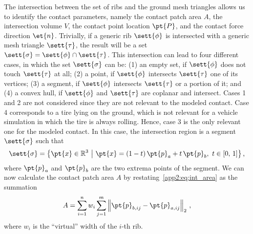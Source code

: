 The intersection between the set of ribs  and the ground mesh triangles  allows us to identify the contact parameters, namely the contact patch area $A$, the intersection volume $V$, the contact point location $\pt{P}$, and the contact force direction $\et{n}$. Trivially, if a generic rib $\sett{\phi}$ is intersected with a generic mesh triangle $\sett{\tau}$, the result will be a set $\sett{\sigma} = \sett{\phi} \cap \sett{\tau}$. This intersection can lead to four different cases, in which the set $\sett{\sigma}$ can be: (1) an empty set, if $\sett{\phi}$ does not touch $\sett{\tau}$ at all; (2) a point, if $\sett{\phi}$ intersects $\sett{\tau}$ one of its vertices; (3) a segment, if $\sett{\phi}$ intersects $\sett{\tau}$ or a portion of it; and (4) a convex hull, if $\sett{\phi}$ and $\sett{\tau}$ are coplanar and intersect. Cases 1 and 2 are not considered since they are not relevant to the modeled contact. Case 4 corresponds to a tire lying on the ground, which is not relevant for a vehicle simulation in which the tire is always rolling. Hence, case 3 is the only relevant one for the modeled contact. In this case, the intersection region is a segment $\sett{\sigma}$ such that
%
\begin{equation*}
  \sett{\sigma} = \big\{ \pt{x}\in\mathbb{R}^3 ~ \big\lvert ~ \pt{x}=(1-t)\,\pt{p}_a + t\,\pt{p}_b, ~ t \in [0, \, 1] \big\}
   \, \text{,}
\end{equation*}
%
where $\pt{p}_a$ and $\pt{p}_b$ are the two extrema points of the segment. We can now calculate the contact patch area $A$ by restating~\eqref{app2:eq:int_area} as the summation
%
\begin{equation}
  A = \sum_{i=1}^{n} w_i \sum_{j=1}^{m} \left\|\pt{p}_{b,ij} - \pt{p}_{a,ij}\right\|_{2}
   \, \text{,}
  \label{app2:eq:int_a_crt}
\end{equation}
%
where $w_i$ is the ``virtual'' width of the $i$-th rib.

